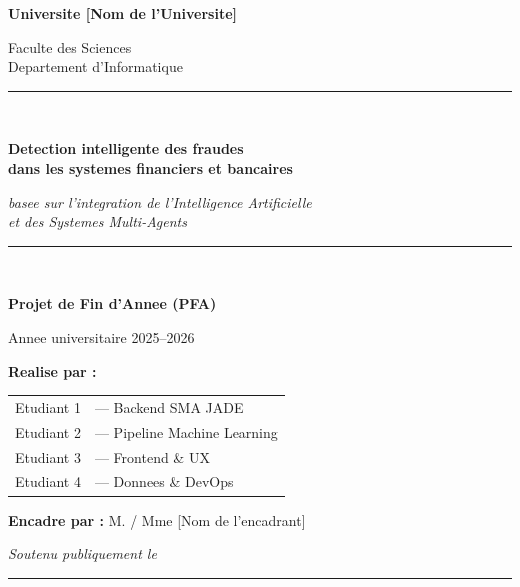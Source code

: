 \documentclass[12pt,a4paper,oneside]{report}
\begin{document}

\begin{titlepage}
  \centering
  \vspace*{1cm}

  {\large\bfseries Universite [Nom de l'Universite]\par}
  {\large Faculte des Sciences \\ Departement d'Informatique\par}
  \vspace{0.6cm}

  \rule{\linewidth}{0.6pt}\\[0.4cm]
  {\Huge\bfseries\color{pfaDark} Detection intelligente des fraudes\\[0.2cm]
   dans les systemes financiers et bancaires\par}
  \vspace{0.4cm}
  {\Large\itshape basee sur l'integration de l'Intelligence Artificielle\\
   et des Systemes Multi-Agents\par}
  \rule{\linewidth}{0.6pt}\\[1cm]

  {\large\bfseries Projet de Fin d'Annee (PFA)\par}
  {\large Annee universitaire 2025--2026\par}
  \vspace{1.5cm}

  \begin{flushleft}
  {\large\bfseries Realise par :} \\[0.2cm]
  \begin{tabular}{ll}
    Etudiant 1 & --- Backend SMA JADE \\
    Etudiant 2 & --- Pipeline Machine Learning \\
    Etudiant 3 & --- Frontend \& UX \\
    Etudiant 4 & --- Donnees \& DevOps \\
  \end{tabular}
  \end{flushleft}
  \vspace{1cm}
  \begin{flushleft}
  {\large\bfseries Encadre par :} M. / Mme [Nom de l'encadrant]\par
  \end{flushleft}

  \vfill
  {\small\itshape Soutenu publiquement le \rule{3cm}{0.3pt}\par}
\end{titlepage}
\end{document}
